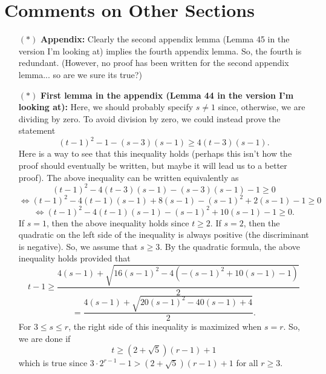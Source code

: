 \documentclass[11 pt]{article}
\begin{document}
\section{Comments on Other Sections}

\begin{itemize}
\item[$\boldsymbol{(*)}$] \textbf{Appendix:} Clearly the second appendix lemma (Lemma 45 in the version I'm looking at) implies the fourth appendix lemma. So, the fourth is redundant. (However, no proof has been written for the second appendix lemma... so are we sure its true?) 
\item[$\boldsymbol{(*)}$]  \textbf{First lemma in the appendix (Lemma 44 in the version I'm looking at):}  Here, we should probably specify $s\neq 1$ since, otherwise, we are dividing by zero. To avoid division by zero, we could instead prove the statement 
\[(t-1)^2 - 1 - (s-3)(s-1) \geq 4(t-3)(s-1).\]
Here is a way to see that this inequality holds (perhaps this isn't how the proof should eventually be written, but maybe it will lead us to a better proof). The above inequality can be written equivalently as
\[(t-1)^2 - 4(t-3)(s-1) - (s-3)(s-1) - 1 \geq0\]
\[\Leftrightarrow (t-1)^2 - 4(t-1)(s-1) + 8(s-1) - (s-1)^2 + 2(s-1)- 1 \geq0\]
\[\Leftrightarrow (t-1)^2 - 4(t-1)(s-1) - (s-1)^2 + 10(s-1)- 1 \geq0.\]
If $s=1$, then the above inequality holds since $t\geq2$. If $s=2$, then the quadratic on the left side of the inequality is always positive (the discriminant is negative). So, we assume that $s\geq3$. By the quadratic formula, the above inequality holds provided that
\[t-1\geq \frac{4(s-1) + \sqrt{16(s-1)^2 - 4(-(s-1)^2 + 10(s-1)-1)}}{2}\]
\[=\frac{4(s-1) + \sqrt{20(s-1)^2 - 40(s-1) + 4}}{2}.\]
For $3\leq s\leq r$, the right side of this inequality is maximized when $s=r$. So, we are done if
\[t\geq \left(2+\sqrt{5}\right)(r-1) + 1\]
which is true since $3\cdot 2^{r-1} - 1 > \left(2+\sqrt{5}\right)(r-1) + 1$ for all $r\geq3$.  
\end{itemize}
\end{document}
